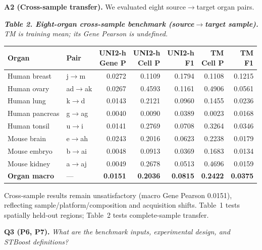 \documentclass[10pt]{article}
\begin{document}
\textbf{A2 (Cross-sample transfer).}\enspace
We evaluated eight source\(\rightarrow\)target organ pairs.
\begin{center}
\begingroup
\footnotesize
\setlength{\tabcolsep}{3.4pt}
\renewcommand{\arraystretch}{1.06}
\textit{\textbf{Table 2. Eight-organ cross-sample benchmark
(source$\rightarrow$target sample).} TM is training mean; its Gene Pearson is
undefined.}\\[3pt]
\begin{tabular*}{\linewidth}{@{\extracolsep{\fill}}llrrrrr@{}}
\toprule
Organ & Pair & \shortstack{UNI2-h\\Gene P} & \shortstack{UNI2-h\\Cell P} &
\shortstack{UNI2-h\\F1} & \shortstack{TM\\Cell P} & \shortstack{TM\\F1} \\
\midrule
Human breast & j$\rightarrow$m & 0.0272 & 0.1109 & 0.1794 & 0.1108 & 0.1215 \\
Human ovary & ad$\rightarrow$ak & 0.0267 & 0.4593 & 0.1161 & 0.4906 & 0.0561 \\
Human lung & k$\rightarrow$d & 0.0143 & 0.2121 & 0.0960 & 0.1455 & 0.0236 \\
Human pancreas & g$\rightarrow$ag & 0.0040 & 0.0090 & 0.0389 & 0.0023 & 0.0168 \\
Human tonsil & u$\rightarrow$i & 0.0141 & 0.2769 & 0.0708 & 0.3264 & 0.0346 \\
Mouse brain & e$\rightarrow$ah & 0.0243 & 0.2016 & 0.0623 & 0.2238 & 0.0179 \\
Mouse embryo & b$\rightarrow$ai & 0.0048 & 0.0913 & 0.0369 & 0.1683 & 0.0134 \\
Mouse kidney & a$\rightarrow$aj & 0.0049 & 0.2678 & 0.0513 & 0.4696 & 0.0159 \\
\midrule
\textbf{Organ macro} & --- & \textbf{0.0151} & \textbf{0.2036} &
\textbf{0.0815} & \textbf{0.2422} & \textbf{0.0375} \\
\bottomrule
\end{tabular*}
\endgroup
\end{center}

Cross-sample results remain unsatisfactory (macro Gene Pearson 0.0151),
reflecting sample/platform/composition and acquisition shifts. Table~1 tests
spatially held-out regions; Table~2 tests complete-sample transfer.

\newpage
\textbf{Q3 (P6, P7).}\quad
\textit{What are the benchmark inputs, experimental design, and STBoost
definitions?}
\end{document}
